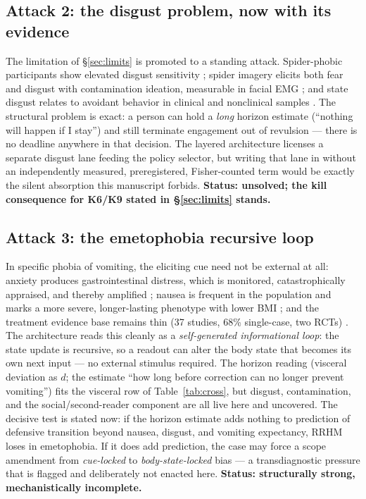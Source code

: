 \documentclass[9pt,twocolumn]{article}
\begin{document}
\subsection{Attack 2: the disgust problem, now with its evidence}
The limitation of \S\ref{sec:limits} is promoted to a standing attack. Spider-phobic participants show elevated disgust sensitivity \cite{merckelbach1996}; spider imagery elicits both fear and disgust with contamination ideation, measurable in facial EMG \cite{devries2002}; and state disgust relates to avoidant behavior in clinical and nonclinical samples \cite{woody2002}. The structural problem is exact: a person can hold a \emph{long} horizon estimate (``nothing will happen if I stay'') and still terminate engagement out of revulsion --- there is no deadline anywhere in that decision. The layered architecture licenses a separate disgust lane feeding the policy selector, but writing that lane in without an independently measured, preregistered, Fisher-counted term would be exactly the silent absorption this manuscript forbids. \textbf{Status: unsolved; the kill consequence for K6/K9 stated in \S\ref{sec:limits} stands.}

\subsection{Attack 3: the emetophobia recursive loop}
In specific phobia of vomiting, the eliciting cue need not be external at all: anxiety produces gastrointestinal distress, which is monitored, catastrophically appraised, and thereby amplified \cite{boschen2007}; nausea is frequent in the population and marks a more severe, longer-lasting phenotype with lower BMI \cite{vandenbergh2013}; and the treatment evidence base remains thin (37 studies, 68\% single-case, two RCTs) \cite{keyes2026}. The architecture reads this cleanly as a \emph{self-generated informational loop}: the state update is recursive, so a readout can alter the body state that becomes its own next input --- no external stimulus required. The horizon reading (visceral deviation as $d$; the estimate ``how long before correction can no longer prevent vomiting'') fits the visceral row of Table~\ref{tab:cross}, but disgust, contamination, and the social/second-reader component are all live here and uncovered. The decisive test is stated now: if the horizon estimate adds nothing to prediction of defensive transition beyond nausea, disgust, and vomiting expectancy, RRHM loses in emetophobia. If it does add prediction, the case may force a scope amendment from \emph{cue-locked} to \emph{body-state-locked} bias --- a transdiagnostic pressure that is flagged and deliberately not enacted here. \textbf{Status: structurally strong, mechanistically incomplete.}
\end{document}
